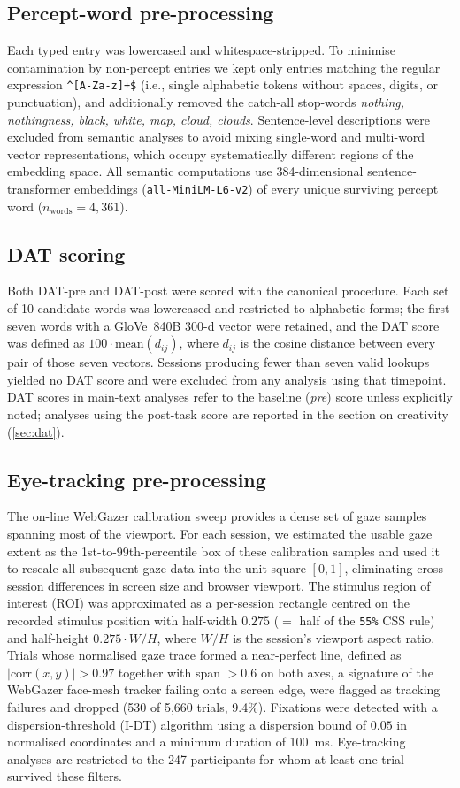 \documentclass[11pt]{article}
\begin{document}
\subsection{Percept-word pre-processing}
Each typed entry was lowercased and whitespace-stripped. To minimise
contamination by non-percept entries we kept only entries matching the
regular expression \verb|^[A-Za-z]+$| (i.e., single alphabetic tokens
without spaces, digits, or punctuation), and additionally removed the
catch-all stop-words \emph{nothing, nothingness, black, white, map,
cloud, clouds}. Sentence-level descriptions were excluded from semantic
analyses to avoid mixing single-word and multi-word vector
representations, which occupy systematically different regions of the
embedding space. All semantic computations use 384-dimensional
sentence-transformer embeddings (\texttt{all-MiniLM-L6-v2}) of every
unique surviving percept word ($n_{\text{words}} = 4{,}361$).

\subsection{DAT scoring}
Both DAT-pre and DAT-post were scored with the canonical
\citet{Olson2021dat} procedure. Each set of 10 candidate words was
lowercased and restricted to alphabetic forms; the first seven words
with a GloVe~840B 300-d vector were retained, and the DAT score was
defined as $100 \cdot \text{mean}(d_{ij})$, where $d_{ij}$ is the
cosine distance between every pair of those seven vectors. Sessions
producing fewer than seven valid lookups yielded no DAT score and were
excluded from any analysis using that timepoint. DAT scores in
main-text analyses refer to the baseline (\emph{pre}) score unless
explicitly noted; analyses using the post-task score are reported in
the section on creativity (\ref{sec:dat}).

\subsection{Eye-tracking pre-processing}
The on-line WebGazer calibration sweep provides a dense set of gaze
samples spanning most of the viewport. For each session, we estimated
the usable gaze extent as the 1st-to-99th-percentile box of these
calibration samples and used it to rescale all subsequent gaze data
into the unit square $[0, 1]$, eliminating cross-session differences
in screen size and browser viewport. The stimulus region of interest
(ROI) was approximated as a per-session rectangle centred on the
recorded stimulus position with half-width $0.275$ (\(=\) half of the
\texttt{55\%} CSS rule) and half-height $0.275 \cdot W/H$, where
$W/H$ is the session's viewport aspect ratio. Trials whose normalised
gaze trace formed a near-perfect line, defined as
$|\text{corr}(x, y)| > 0.97$ together with span $> 0.6$ on both axes,
a signature of the WebGazer face-mesh tracker failing onto a screen
edge, were flagged as tracking failures and dropped (530 of 5{,}660
trials, 9.4\%). Fixations were detected with a dispersion-threshold
(I-DT) algorithm using a dispersion bound of $0.05$ in normalised
coordinates and a minimum duration of 100~ms. Eye-tracking analyses
are restricted to the 247 participants for whom at least one trial
survived these filters.
\end{document}
